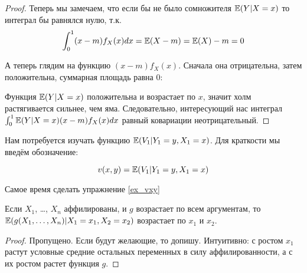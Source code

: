 \begin{proof}
Теперь мы замечаем, что если бы не было сомножителя $ \mathbb{E}(Y|X=x) $ то интеграл бы равнялся нулю, т.к.
\begin{equation}
\int_{0}^{1}(x-m)f_{X}(x)dx=\mathbb{E}(X-m)=\mathbb{E}(X)-m=0
\end{equation}

А теперь глядим на функцию $ (x-m)f_{X}(x) $. Сначала она отрицательна, затем положительна, суммарная площадь равна 0:



Функция $ \mathbb{E}(Y|X=x) $ положительна и возрастает по $ x $, значит холм растягивается сильнее, чем яма. Следовательно, интересующий нас интеграл $ \int_{0}^{1}\mathbb{E}(Y|X=x)(x-m)f_{X}(x)dx $ равный ковариации неотрицательный.


\end{proof}



Нам потребуется изучать функцию $ \mathbb{E}(V_{1}|Y_{1}=y, X_{1}=x) $.  Для краткости мы введём обозначение:

\begin{mydef}
\begin{equation}
v(x,y)=\mathbb{E}(V_{1}|Y_{1}=y, X_{1}=x)
\end{equation}
\end{mydef}

Самое время сделать упражнение \ref{ex_vxy}

\begin{myth}
\label{aff_multi_f}
Если $ X_{1} $, \ldots, $ X_{n} $ аффилированы, и $ g $ возрастает по всем аргументам, то $\mathbb{E}(g(X_{1},\ldots,X_{n})|X_{1}=x_{1},X_{2}=x_{2}) $ возрастает по $ x_{1} $ и $ x_{2} $.
\end{myth}

\begin{proof}
Пропущено. Если будут желающие, то допишу. Интуитивно: с ростом $ x_{1} $ растут условные средние остальных переменных в силу аффилированности, а с их ростом растет функция $ g $.
\end{proof}

